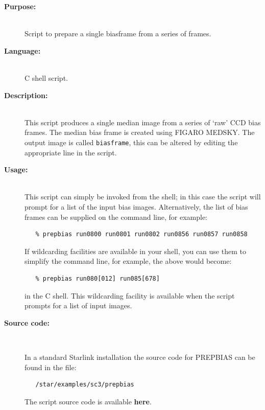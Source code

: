 \documentclass[twoside,11pt]{article}
\newcommand{\htmlref}[2]{#1}
\newcommand{\xref}[3]{#1}
\begin{document}
\begin{description}

\item [{\bf Purpose:}] \mbox{} \\
     Script to prepare a single biasframe from a series of frames.

\item [{\bf Language:}] \mbox{} \\
     C shell script.

\item [{\bf Description:}] \mbox{} \\
     This script produces a single median image from a series of
     `raw' CCD bias frames.  The median bias frame is created using
     \xref{FIGARO}{sun86}{} \xref{MEDSKY}{sun86}{MEDSKY}.  The output
     image is called \verb+biasframe+, this can be altered by editing
     the appropriate line in the script.

\item [{\bf Usage:}] \mbox{} \\
     This script can simply be invoked from the shell; in this case
     the script will prompt for a list of the input bias images.
     Alternatively, the list of bias frames can be supplied on the
     command line, for example:

\begin{verbatim}
   % prepbias run0800 run0801 run0802 run0856 run0857 run0858
\end{verbatim}

     If wildcarding facilities are available in your shell, you can use
     them to simplify the command line, for example, the above would
     become:

\begin{verbatim}
   % prepbias run080[012] run085[678]
\end{verbatim}

     in the C shell.  This wildcarding facility is available when the
     script prompts for a list of input images.

\item [{\bf Source code:}] \mbox{} \\
\begin{latex}
In a standard Starlink installation the source code for PREPBIAS can be found
in the file:
\begin{verbatim}
   /star/examples/sc3/prepbias
\end{verbatim}
\end{latex}
\begin{htmlonly}
      The script source code is available
      \htmlref{{\bf here}}{se_prepbias_source}.
\end{htmlonly}


\end{description}
\end{document}

